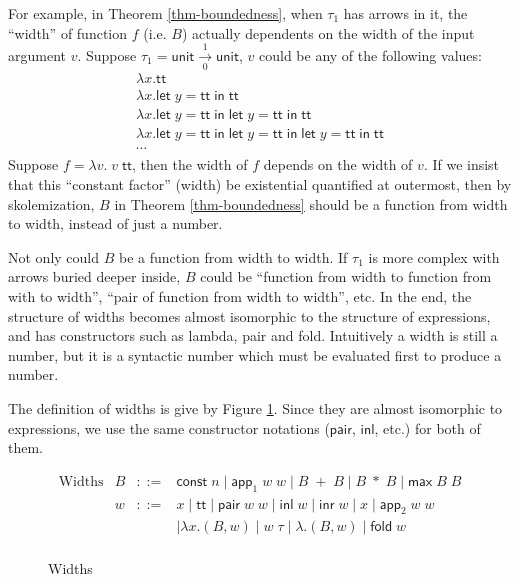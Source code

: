 \documentclass[preprint]{sigplanconf}
\newcommand{\arrow}[4]{#1\xrightarrow[#3]{#2}#4}
\newcommand{\symlet}{\mathsf{let\;}}
\newcommand{\symin}{\mathsf{\;in\;}}
\newcommand{\syminl}{\mathsf{inl}}
\newcommand{\syminr}{\mathsf{inr}}
\newcommand{\symmax}{\mathsf{max}}
\newcommand{\symfold}{\mathsf{fold}}
\newcommand{\sympair}{\mathsf{pair}}
\newcommand{\symtt}{\mathsf{tt}}
\newcommand{\symunit}{\mathsf{unit}}
\newcommand{\symapp}{\mathsf{app}}
\begin{document}
For example, in Theorem \ref{thm-boundedness}, when $\tau_1$ has arrows in it, the ``width'' of function $f$ (i.e. $B$) actually dependents on the width of the input argument $v$. Suppose $\tau_1=\arrow{\symunit}{1}{0}{\symunit}$, $v$ could be any of the following values:
$$
\begin{array}{l}
  \lambda x.\symtt \\
  \lambda x.\symlet y=\symtt\symin\symtt \\
  \lambda x.\symlet y=\symtt\symin\symlet y=\symtt\symin\symtt \\
  \lambda x.\symlet y=\symtt\symin\symlet y=\symtt\symin\symlet y=\symtt\symin\symtt \\
  \cdots
\end{array}
$$
Suppose $f=\lambda v.\; v\;\symtt$, then the width of $f$ depends on the width of $v$. If we insist that this ``constant factor'' (width) be existential quantified at outermost, then by skolemization, $B$ in Theorem \ref{thm-boundedness} should be a function from width to width, instead of just a number. 

Not only could $B$ be a function from width to width. If $\tau_1$ is more complex with arrows buried deeper inside, $B$ could be ``function from width to function from with to width'', ``pair of function from width to width'', etc. In the end, the structure of widths becomes almost isomorphic to the structure of expressions, and has constructors such as lambda, pair and fold. Intuitively a width is still a number, but it is a syntactic number which must be evaluated first to produce a number.

The definition of widths is give by Figure \ref{widths}. Since they are almost isomorphic to expressions, we use the same constructor notations ($\sympair$, $\syminl$, etc.) for both of them.

\begin{figure}
$$\begin{array}{rrcl}
  \textrm{Widths} & B &::=& \mathsf{const}\;n \mid \symapp_1\;w\;w \mid B\;+\;B \mid B\;*\;B \mid \symmax\;B\;B \\
  & w &::=& x \mid \symtt \mid \sympair\;w\;w \mid \syminl\;w \mid \syminr\;w \mid x \mid \symapp_2\;w\;w \\
  & & & \mid \lambda x.(B,w) \mid w\;\tau \mid \lambda.(B,w) \mid \symfold\; w \\
\end{array}$$
\caption{\label{widths}Widths}
\end{figure}
\end{document}

